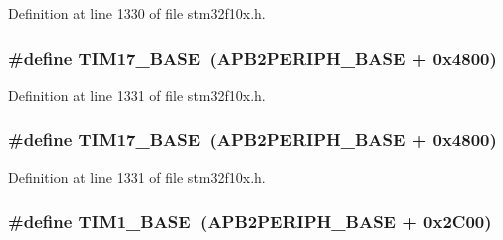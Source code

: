 Definition at line 1330 of file stm32f10x.\+h.

\subsubsection[{\texorpdfstring{T\+I\+M17\+\_\+\+B\+A\+SE}{TIM17_BASE}}]{\setlength{\rightskip}{0pt plus 5cm}\#define T\+I\+M17\+\_\+\+B\+A\+SE~({\bf A\+P\+B2\+P\+E\+R\+I\+P\+H\+\_\+\+B\+A\+SE} + 0x4800)}\hypertarget{group___peripheral__memory__map_gaffbedbe30e8c4cffdea326d6c1800574}{}\label{group___peripheral__memory__map_gaffbedbe30e8c4cffdea326d6c1800574}


Definition at line 1331 of file stm32f10x.\+h.

\subsubsection[{\texorpdfstring{T\+I\+M17\+\_\+\+B\+A\+SE}{TIM17_BASE}}]{\setlength{\rightskip}{0pt plus 5cm}\#define T\+I\+M17\+\_\+\+B\+A\+SE~({\bf A\+P\+B2\+P\+E\+R\+I\+P\+H\+\_\+\+B\+A\+SE} + 0x4800)}\hypertarget{group___peripheral__memory__map_gaffbedbe30e8c4cffdea326d6c1800574}{}\label{group___peripheral__memory__map_gaffbedbe30e8c4cffdea326d6c1800574}


Definition at line 1331 of file stm32f10x.\+h.

\subsubsection[{\texorpdfstring{T\+I\+M1\+\_\+\+B\+A\+SE}{TIM1_BASE}}]{\setlength{\rightskip}{0pt plus 5cm}\#define T\+I\+M1\+\_\+\+B\+A\+SE~({\bf A\+P\+B2\+P\+E\+R\+I\+P\+H\+\_\+\+B\+A\+SE} + 0x2\+C00)}\hypertarget{group___peripheral__memory__map_gaf8aa324ca5011b8173ab16585ed7324a}{}\label{group___peripheral__memory__map_gaf8aa324ca5011b8173ab16585ed7324a}


